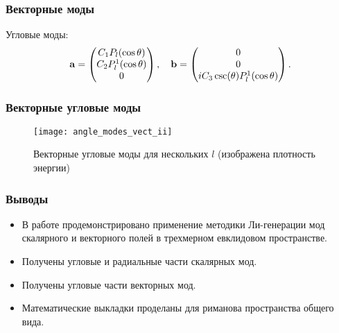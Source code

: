 \documentclass{beamer}
\begin{document}
    \begin{frame}\frametitle{Векторные моды}

        Угловые моды:
        \begin{equation}
            \vb{a} = \begin{pmatrix}
                C_1 P_l(\cos\theta) \\
                C_2 P_l^1(\cos\theta) \\
                0
            \end{pmatrix} , \quad
            \vb{b} = \begin{pmatrix}
                0 \\
                0 \\
                i C_3 \csc(\theta) P_l^1(\cos\theta)
            \end{pmatrix} .
        \end{equation}

    \end{frame}


    \begin{frame}\frametitle{Векторные угловые моды}

        \begin{figure}[h]
            \centering
            \texttt{[image: angle\_modes\_vect\_ii]}
            \caption[]{Векторные угловые моды для нескольких $l$ (изображена плотность энергии)}
            \label{fig:angle_modes_vect_ii}
        \end{figure}

    \end{frame}


    \begin{frame}\frametitle{Выводы}

        \begin{itemize}
            \item В работе продемонстрировано применение методики Ли-генерации мод скалярного и векторного полей в трехмерном евклидовом пространстве.

            \item Получены угловые и радиальные части скалярных мод.

            \item Получены угловые части векторных мод.

            \item Математические выкладки проделаны для риманова пространства общего вида.
        \end{itemize}

    \end{frame}
\end{document}
